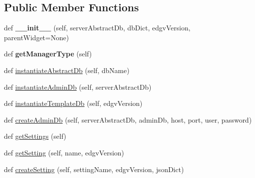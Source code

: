 \subsection*{Public Member Functions}
\begin{DoxyCompactItemize}
\item 
\mbox{\label{class_dsg_tools_1_1_server_management_tools_1_1generic_db_manager_1_1_generic_db_manager_ac917286a34bc473d9321ee28927bad73}} 
def {\bfseries \+\_\+\+\_\+init\+\_\+\+\_\+} (self, server\+Abstract\+Db, db\+Dict, edgv\+Version, parent\+Widget=None)
\item 
\mbox{\label{class_dsg_tools_1_1_server_management_tools_1_1generic_db_manager_1_1_generic_db_manager_ad8201c690edf80469d0c79d7dcd1a408}} 
def {\bfseries get\+Manager\+Type} (self)
\item 
def \mbox{\hyperlink{class_dsg_tools_1_1_server_management_tools_1_1generic_db_manager_1_1_generic_db_manager_a499067804c2e6a36ad74e93e14c9d955}{instantiate\+Abstract\+Db}} (self, db\+Name)
\item 
def \mbox{\hyperlink{class_dsg_tools_1_1_server_management_tools_1_1generic_db_manager_1_1_generic_db_manager_a2bb83de55a8a35f7f9f1d73482291b97}{instantiate\+Admin\+Db}} (self, server\+Abstract\+Db)
\item 
def \mbox{\hyperlink{class_dsg_tools_1_1_server_management_tools_1_1generic_db_manager_1_1_generic_db_manager_afdb4c9149490e8c8b751f0d15eb8a54d}{instantiate\+Template\+Db}} (self, edgv\+Version)
\item 
def \mbox{\hyperlink{class_dsg_tools_1_1_server_management_tools_1_1generic_db_manager_1_1_generic_db_manager_ab580a3306767739723fe615dba913d00}{create\+Admin\+Db}} (self, server\+Abstract\+Db, admin\+Db, host, port, user, password)
\item 
def \mbox{\hyperlink{class_dsg_tools_1_1_server_management_tools_1_1generic_db_manager_1_1_generic_db_manager_a4817d8093103ba3574d693fb172ad89b}{get\+Settings}} (self)
\item 
def \mbox{\hyperlink{class_dsg_tools_1_1_server_management_tools_1_1generic_db_manager_1_1_generic_db_manager_a31b4f877b09455ef4b360fb141fdb72e}{get\+Setting}} (self, name, edgv\+Version)
\item 
def \mbox{\hyperlink{class_dsg_tools_1_1_server_management_tools_1_1generic_db_manager_1_1_generic_db_manager_a254da2318a0a95fb0ddd84f6b0eb8333}{create\+Setting}} (self, setting\+Name, edgv\+Version, json\+Dict)

\end{DoxyCompactItemize}

